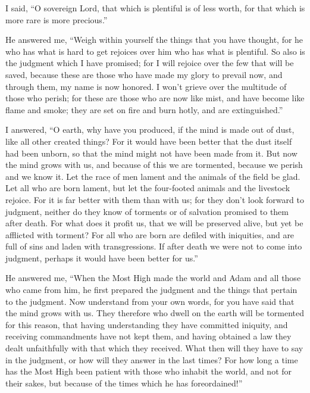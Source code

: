  I said, ``O sovereign Lord, that which is plentiful is of
less worth, for that which is more rare is more precious.''

 He answered me, ``Weigh within yourself the things that
you have thought, for he who has what is hard to get rejoices over him
who has what is plentiful.  So also is the judgment which I
have promised; for I will rejoice over the few that will be saved,
because these are those who have made my glory to prevail now, and
through them, my name is now honored.  I won't grieve over
the multitude of those who perish; for these are those who are now like
mist, and have become like flame and smoke; they are set on fire and
burn hotly, and are extinguished.''

 I answered, ``O earth, why have you produced, if the mind
is made out of dust, like all other created things?  For it
would have been better that the dust itself had been unborn, so that the
mind might not have been made from it.  But now the mind
grows with us, and because of this we are tormented, because we perish
and we know it.  Let the race of men lament and the animals
of the field be glad. Let all who are born lament, but let the
four-footed animals and the livestock rejoice.  For it is
far better with them than with us; for they don't look forward to
judgment, neither do they know of torments or of salvation promised to
them after death.  For what does it profit us, that we will
be preserved alive, but yet be afflicted with torment?  For
all who are born are defiled with iniquities, and are full of sins and
laden with transgressions.  If after death we were not to
come into judgment, perhaps it would have been better for us.''

 He answered me, ``When the Most High made the world and
Adam and all those who came from him, he first prepared the judgment and
the things that pertain to the judgment.  Now understand
from your own words, for you have said that the mind grows with us.
 They therefore who dwell on the earth will be tormented
for this reason, that having understanding they have committed iniquity,
and receiving commandments have not kept them, and having obtained a law
they dealt unfaithfully with that which they received. 
What then will they have to say in the judgment, or how will they answer
in the last times?  For how long a time has the Most High
been patient with those who inhabit the world, and not for their sakes,
but because of the times which he has foreordained!''

